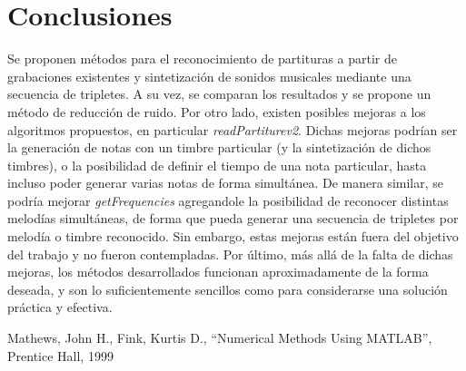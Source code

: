 \documentclass[journal, monochrome]{IEEEtran}
\begin{document}
\vspace{1cm}
\section{Conclusiones}
\label{section:conclusions}
\vspace{0.5cm}

Se proponen métodos para el reconocimiento de partituras a partir de grabaciones existentes y sintetización de sonidos musicales mediante una secuencia de tripletes. A su vez, se comparan los resultados y se propone un método de reducción de ruido. Por otro lado, existen posibles mejoras a los algoritmos propuestos, en particular \emph{readPartiturev2}. Dichas mejoras podrían ser la generación de notas con un timbre particular (y la sintetización de dichos timbres), o la posibilidad de definir el tiempo de una nota particular, hasta incluso poder generar varias notas de forma simultánea. De manera similar, se podría mejorar \emph{getFrequencies} agregandole la posibilidad de reconocer distintas melodías simultáneas, de forma que pueda generar una secuencia de tripletes por melodía o timbre reconocido. Sin embargo, estas mejoras están fuera del objetivo del trabajo y no fueron contempladas. Por último, más allá de la falta de dichas mejoras, los métodos desarrollados funcionan aproximadamente de la forma deseada, y son lo suficientemente sencillos como para considerarse una solución práctica y efectiva.


\vspace{1cm}
\begin{thebibliography}{1}
	Mathews, John H.,
	Fink, Kurtis D.,
	``Numerical Methods Using MATLAB'',
	Prentice Hall,
	1999
	
\end{thebibliography}





\begin{figure}
	
\end{figure}
\begin{figure}
	
\end{figure}
\begin{figure}
	
\end{figure}
\begin{figure}
	
\end{figure}
\end{document}
